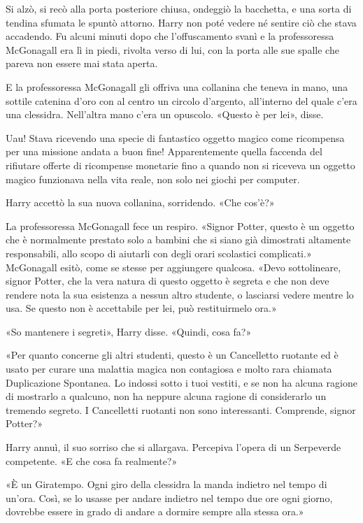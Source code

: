 Si alzò, si recò alla porta posteriore chiusa, ondeggiò la bacchetta, e una sorta di tendina sfumata le spuntò attorno. Harry non poté vedere né sentire ciò che stava accadendo. Fu alcuni minuti dopo che l’offuscamento svanì e la professoressa McGonagall era lì in piedi, rivolta verso di lui, con la porta alle sue spalle che pareva non essere mai stata aperta.

E la professoressa McGonagall gli offriva una collanina che teneva in mano, una sottile catenina d’oro con al centro un circolo d’argento, all’interno del quale c’era una clessidra. Nell’altra mano c’era un opuscolo. «Questo è per lei», disse.

Uau! Stava ricevendo una specie di fantastico oggetto magico come ricompensa per una missione andata a buon fine! Apparentemente quella faccenda del rifiutare offerte di ricompense monetarie fino a quando non si riceveva un oggetto magico funzionava nella vita reale, non solo nei giochi per computer.

Harry accettò la sua nuova collanina, sorridendo. «Che cos’è?»

La professoressa McGonagall fece un respiro. «Signor Potter, questo è un oggetto che è normalmente prestato solo a bambini che si siano già dimostrati altamente responsabili, allo scopo di aiutarli con degli orari scolastici complicati.» McGonagall esitò, come se stesse per aggiungere qualcosa. «Devo sottolineare, signor Potter, che la vera natura di questo oggetto è segreta e che non deve rendere nota la sua esistenza a nessun altro studente, o lasciarsi vedere mentre lo usa. Se questo non è accettabile per lei, può restituirmelo ora.»

«So mantenere i segreti», Harry disse. «Quindi, cosa fa?»

«Per quanto concerne gli altri studenti, questo è un Cancelletto ruotante ed è usato per curare una malattia magica non contagiosa e molto rara chiamata Duplicazione Spontanea. Lo indossi sotto i tuoi vestiti, e se non ha alcuna ragione di mostrarlo a qualcuno, non ha neppure alcuna ragione di considerarlo un tremendo segreto. I Cancelletti ruotanti non sono interessanti. Comprende, signor Potter?»

Harry annuì, il suo sorriso che si allargava. Percepiva l’opera di un Serpeverde competente. «E che cosa fa realmente?»

«È un Giratempo. Ogni giro della clessidra la manda indietro nel tempo di un’ora. Così, se lo usasse per andare indietro nel tempo due ore ogni giorno, dovrebbe essere in grado di andare a dormire sempre alla stessa ora.»

